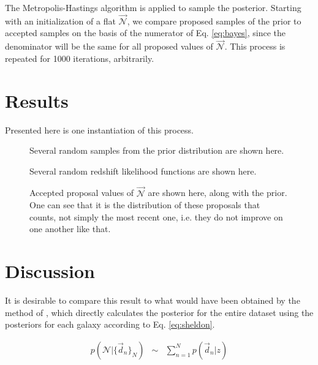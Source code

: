 \documentclass[12pt, onecolumn]{emulateapj}
\begin{document}
The Metropolis-Hastings algorithm is applied to sample the posterior.  Starting with an initialization of a flat $\vec{\mathcal{N}}$, we compare proposed samples of the prior to accepted samples on the basis of the numerator of Eq. \ref{eq:bayes}, since the denominator will be the same for all proposed values of $\vec{\mathcal{N}}$.  This process is repeated for 1000 iterations, arbitrarily.

\section{Results}

Presented here is one instantiation of this process.

\begin{figure}
\label{fig:priors}
\caption{Several random samples from the prior distribution are shown here.}
\end{figure}

\begin{figure}
\label{fig:pzs}
\caption{Several random redshift likelihood functions are shown here.  }
\end{figure}

\begin{figure}
\label{fig:results}
\caption{Accepted proposal values of $\vec{\mathcal{N}}$ are shown here, along with the prior.  One can see that it is the distribution of these proposals that counts, not simply the most recent one, i.e. they do not improve on one another like that.}
\end{figure}

\section{Discussion}

It is desirable to compare this result to what would have been obtained by the method of \citet{she11}, which directly calculates the posterior for the entire dataset using the posteriors for each galaxy according to Eq. \ref{eq:sheldon}.

\begin{eqnarray}
\label{eq:sheldon}
p(\mathcal{N}|\{\vec{d}_{n}\}_{N}) &\sim& \sum_{n=1}^{N}p(\vec{d}_{n}|z)
\end{eqnarray}


\end{document}
